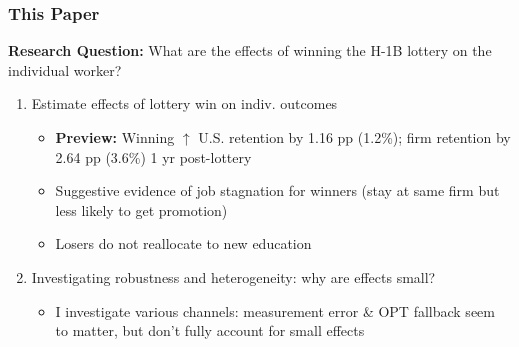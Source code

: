 \documentclass[xcolor=dvipsnames, compress, 12pt, aspectratio=169, presentation]{beamer}
\begin{document}
\begin{frame}
    \frametitle{This Paper}
    \textbf{Research Question:} What are the effects of winning the H-1B lottery on the individual worker?
    \vspace{4mm}
    \begin{enumerate}
        \item Estimate effects of lottery win on indiv. outcomes
        \begin{itemize}
            \item \textbf{Preview:} Winning $\uparrow$ U.S. retention by 1.16 pp (1.2\%); firm retention by 2.64 pp (3.6\%) 1 yr post-lottery
            \item Suggestive evidence of job stagnation for winners (stay at same firm but less likely to get promotion)
            \item Losers do not reallocate to new education
        \end{itemize}
        
        \vspace{3mm}
        \item Investigating robustness and heterogeneity: why are effects small?
        \begin{itemize}
            \item I investigate various channels: measurement error \& OPT fallback seem to matter, but don't fully account for small effects
        \end{itemize}
    \end{enumerate} \vspace{2mm}
\end{frame}
\end{document}
